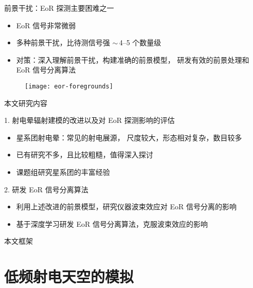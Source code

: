\documentclass{beamer}
\begin{document}
\begin{frame}{前景干扰：EoR 探测主要困难之一}
  \begin{itemize}
    \item EoR 信号非常微弱
    \item \alert{多种前景干扰}，比待测信号强 $\sim$\,4--5 个数量级
    \item \alert{对策}：深入理解前景干扰，构建准确的前景模型，
      研发有效的前景处理和 EoR 信号分离算法
  \end{itemize}

  \vspace{-1ex}
  \begin{figure}
    \centering
    \texttt{[image: eor-foregrounds]}
  \end{figure}
\end{frame}

\begin{frame}{本文研究内容}
  \begin{alertblock}{1. 射电晕辐射建模的改进以及对 EoR 探测影响的评估}
    \begin{itemize}
      \item 星系团射电晕：常见的射电展源，
        尺度较大，形态相对复杂，数目较多
      \item 已有研究不多，且比较粗糙，值得深入探讨
      \item 课题组研究星系团的丰富经验
    \end{itemize}
  \end{alertblock}
  \begin{alertblock}{2. 研发 EoR 信号分离算法}
    \begin{itemize}
      \item 利用上述改进的前景模型，研究仪器波束效应对 EoR 信号分离的影响
      \item 基于深度学习研发 EoR 信号分离算法，克服波束效应的影响
    \end{itemize}
  \end{alertblock}
\end{frame}

\begin{frame}{本文框架}
  \begin{figure}
  \end{figure}
\end{frame}


\section{低频射电天空的模拟}
\end{document}
